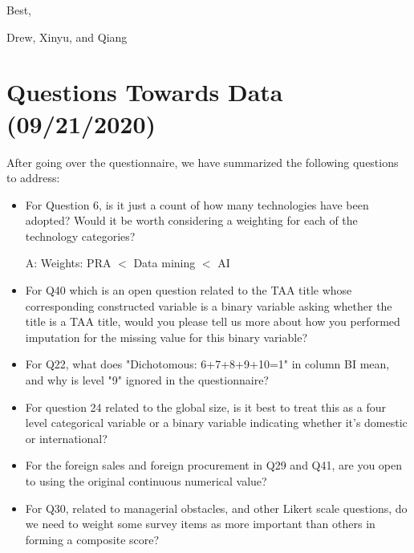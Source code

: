 Best,

Drew, Xinyu, and Qiang




\section{Questions Towards Data (09/21/2020)}




After going over the questionnaire, we have summarized the following questions to address:

\begin{itemize}
    \item For Question 6, is it just a count of how many technologies have been adopted? Would it be worth considering a weighting for each of the technology categories?
    
    A: Weights: PRA $<$ Data mining $<$ AI %
    
    \item For Q40 which is an open question related to the TAA title whose corresponding constructed variable is a binary variable asking whether the title is a TAA title, would you please tell us more about how you performed imputation for the missing value for this binary variable?
    
    \item For Q22, what does "Dichotomous: 6+7+8+9+10=1" in column BI  mean, and why is level "9" ignored in the questionnaire?
    
    \item For question 24 related to the global size, is it best to treat this as a four level categorical variable or a binary variable indicating whether it's domestic or international? 
    
    \item For the foreign sales and foreign procurement in Q29 and Q41, are you open to using the original continuous numerical value?
    
    \item For Q30, related to managerial obstacles, and other Likert scale questions, do we need to weight some survey items as more important than others in forming a composite score? 
    
\end{itemize} 




